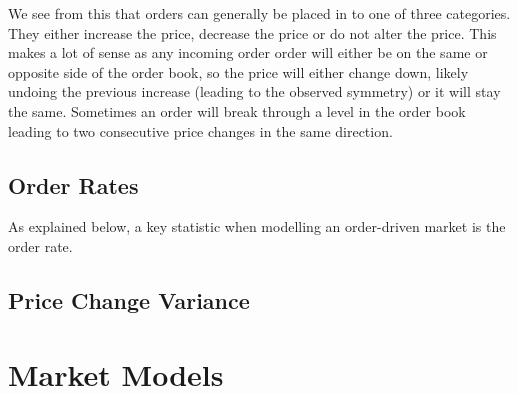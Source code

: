 \documentclass[a4paper,10pt]{article}
\begin{document}
We see from this that orders can generally be placed in to one of three categories. They either increase the price, decrease the price or do not alter the price. This makes a lot of sense as any incoming order order will either be on the same or opposite side of the order book, so the price will either change down, likely undoing the previous increase (leading to the observed symmetry) or it will stay the same. Sometimes an order will break through a level in the order book leading to two consecutive price changes in the same direction.
\subsection{Order Rates}
As explained below, a key statistic when modelling an order-driven market is the order rate.
\subsection{Price Change Variance}
\section{Market Models}
\end{document}
